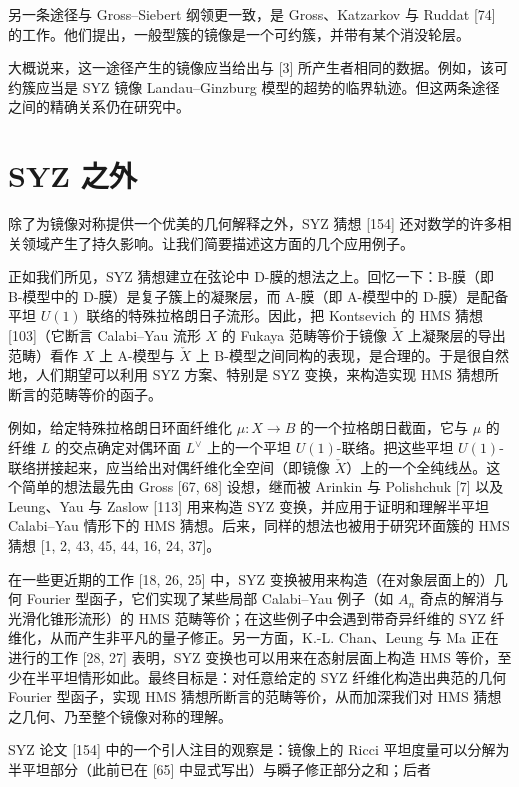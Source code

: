 另一条途径与 Gross--Siebert 纲领更一致，是 Gross、Katzarkov 与 Ruddat [74] 的工作。他们提出，一般型簇的镜像是一个可约簇，并带有某个消没轮层。

大概说来，这一途径产生的镜像应当给出与 [3] 所产生者相同的数据。例如，该可约簇应当是 SYZ 镜像 Landau--Ginzburg 模型的超势的临界轨迹。但这两条途径之间的精确关系仍在研究中。

\section{SYZ 之外}
除了为镜像对称提供一个优美的几何解释之外，SYZ 猜想 [154] 还对数学的许多相关领域产生了持久影响。让我们简要描述这方面的几个应用例子。

正如我们所见，SYZ 猜想建立在弦论中 D-膜的想法之上。回忆一下：B-膜（即 B-模型中的 D-膜）是复子簇上的凝聚层，而 A-膜（即 A-模型中的 D-膜）是配备平坦 $U(1)$ 联络的特殊拉格朗日子流形。因此，把 Kontsevich 的 HMS 猜想 [103]（它断言 Calabi--Yau 流形 $X$ 的 Fukaya 范畴等价于镜像 $\check X$ 上凝聚层的导出范畴）看作 $X$ 上 A-模型与 $\check X$ 上 B-模型之间同构的表现，是合理的。于是很自然地，人们期望可以利用 SYZ 方案、特别是 SYZ 变换，来构造实现 HMS 猜想所断言的范畴等价的函子。

例如，给定特殊拉格朗日环面纤维化 $\mu : X \to B$ 的一个拉格朗日截面，它与 $\mu$ 的纤维 $L$ 的交点确定对偶环面 $L^\vee$ 上的一个平坦 $U(1)$-联络。把这些平坦 $U(1)$-联络拼接起来，应当给出对偶纤维化全空间（即镜像 $\check X$）上的一个全纯线丛。这个简单的想法最先由 Gross [67, 68] 设想，继而被 Arinkin 与 Polishchuk [7] 以及 Leung、Yau 与 Zaslow [113] 用来构造 SYZ 变换，并应用于证明和理解半平坦 Calabi--Yau 情形下的 HMS 猜想。后来，同样的想法也被用于研究环面簇的 HMS 猜想 [1, 2, 43, 45, 44, 16, 24, 37]。

在一些更近期的工作 [18, 26, 25] 中，SYZ 变换被用来构造（在对象层面上的）几何 Fourier 型函子，它们实现了某些局部 Calabi--Yau 例子（如 $A_n$ 奇点的解消与光滑化锥形流形）的 HMS 范畴等价；在这些例子中会遇到带奇异纤维的 SYZ 纤维化，从而产生非平凡的量子修正。另一方面，K.-L. Chan、Leung 与 Ma 正在进行的工作 [28, 27] 表明，SYZ 变换也可以用来在态射层面上构造 HMS 等价，至少在半平坦情形如此。最终目标是：对任意给定的 SYZ 纤维化构造出典范的几何 Fourier 型函子，实现 HMS 猜想所断言的范畴等价，从而加深我们对 HMS 猜想之几何、乃至整个镜像对称的理解。

SYZ 论文 [154] 中的一个引人注目的观察是：镜像上的 Ricci 平坦度量可以分解为半平坦部分（此前已在 [65] 中显式写出）与瞬子修正部分之和；后者

